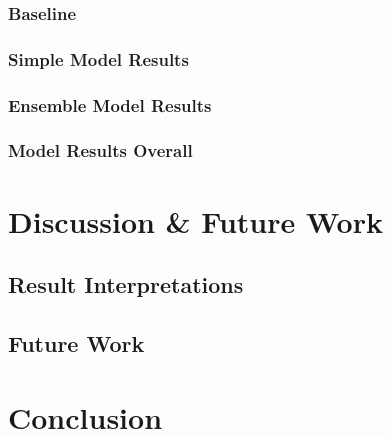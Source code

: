 \documentclass[10pt,sigconf,letterpaper,nonacm]{acmart}
\begin{document}
\subsubsection{Baseline}

\subsubsection{Simple Model Results}

\subsubsection{Ensemble Model Results}

\subsubsection{Model Results Overall}


\section{Discussion \& Future Work}

\subsection{Result Interpretations}

\subsection{Future Work}


\section{Conclusion}





\nocite{*}

\end{document}
